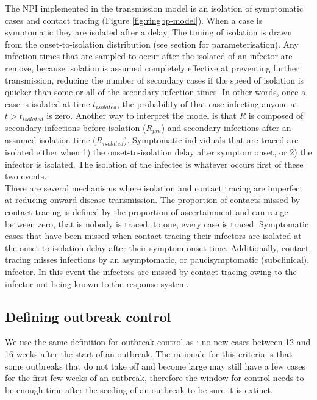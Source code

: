 \documentclass{article}
\begin{document}
The NPI implemented in the transmission model is an isolation of symptomatic cases and contact tracing (Figure \ref{fig:ringbp-model}). When a case is symptomatic they are isolated after a delay. The timing of isolation is drawn from the onset-to-isolation distribution (see  section for parameterisation). Any infection times that are sampled to occur after the isolated of an infector are remove, because isolation is assumed completely effective at preventing further transmission, reducing the number of secondary cases if the speed of isolation is quicker than some or all of the secondary infection times. In other words, once a case is isolated at time $t_{isolated}$, the probability of that case infecting anyone at $t > t_{isolated}$ is zero. Another way to interpret the model is that $R$ is composed of secondary infections before isolation ($R_{pre}$) and secondary infections after an assumed isolation time ($R_{isolated}$). Symptomatic individuals that are traced are isolated either when 1) the onset-to-isolation delay after symptom onset, or 2) the infector is isolated. The isolation of the infectee is whatever occurs first of these two events.  \\

There are several mechanisms where isolation and contact tracing are imperfect at reducing onward disease transmission. The proportion of contacts missed by contact tracing is defined by the proportion of ascertainment and can range between zero, that is nobody is traced, to one, every case is traced. Symptomatic cases that have been missed when contact tracing their infectors are isolated at the onset-to-isolation delay after their symptom onset time. Additionally, contact tracing misses infections by an asymptomatic, or paucisymptomatic (subclinical), infector. In this event the infectees are missed by contact tracing owing to the infector not being known to the response system. \\

\subsection*{Defining outbreak control}

We use the same definition for outbreak control as \cite{hellewellFeasibilityControllingCOVID192020}: no new cases between 12 and 16 weeks after the start of an outbreak. The rationale for this criteria is that some outbreaks that do not take off and become large may still have a few cases for the first few weeks of an outbreak, therefore the window for control needs to be enough time after the seeding of an outbreak to be sure it is extinct. \\
\end{document}
